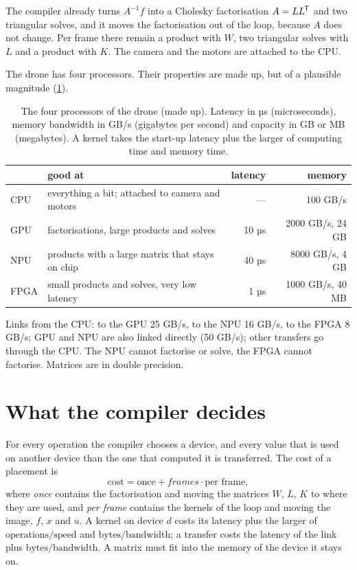 \documentclass[11pt,a4paper]{article}
\newcommand{\inv}{^{-1}}
\newcommand{\T}{^{\mkern-1.5mu\mathsf{T}}}
\begin{document}
The compiler already turns \(A\inv f\) into a Cholesky factorisation
\(A = LL\T\) and two triangular solves, and it moves the factorisation out
of the loop, because \(A\) does not change. Per frame there remain a
product with \(W\), two triangular solves with \(L\) and a product with
\(K\). The camera and the motors are attached to the CPU.

The drone has four processors. Their properties are made up, but of a
plausible magnitude (\cref{tab:devices}).

\begin{table}[h]
\centering\small
\caption{The four processors of the drone (made up). Latency in µs
(microseconds), memory bandwidth in GB/s (gigabytes per second) and
capacity in GB or MB (megabytes). A kernel takes the start-up latency plus
the larger of computing time and memory time.}
\label{tab:devices}
\begin{tabularx}{\linewidth}{@{}lXrr@{}}
\toprule
 & good at & latency & memory \\
\midrule
CPU & everything a bit; attached to camera and motors & --- & 100 GB/s \\
GPU & factorisations, large products and solves & 10 µs & 2000 GB/s, 24 GB \\
NPU & products with a large matrix that stays on chip & 40 µs & 8000 GB/s, 4 GB \\
FPGA & small products and solves, very low latency & 1 µs & 1000 GB/s, 40 MB \\
\bottomrule
\end{tabularx}
\smallskip

\raggedright\footnotesize Links from the CPU: to the GPU 25 GB/s, to the NPU 16 GB/s,
to the FPGA 8 GB/s; GPU and NPU are also linked directly (50 GB/s); other
transfers go through the CPU. The NPU cannot factorise or solve, the FPGA
cannot factorise. Matrices are in double precision.
\end{table}

\section{What the compiler decides}

For every operation the compiler chooses a device, and every value that is
used on another device than the one that computed it is transferred. The
cost of a placement is
\[
  \text{cost} = \text{once} + \mathit{frames}\cdot\text{per frame},
\]
where \emph{once} contains the factorisation and moving the matrices
\(W\), \(L\), \(K\) to where they are used, and \emph{per frame} contains
the kernels of the loop and moving the image, \(f\), \(x\) and \(u\).
A kernel on device \(d\) costs its latency plus the larger of
\(\text{operations}/\text{speed}\) and \(\text{bytes}/\text{bandwidth}\);
a transfer costs the latency of the link plus \(\text{bytes}/\text{bandwidth}\).
A matrix must fit into the memory of the device it stays on.
\end{document}
